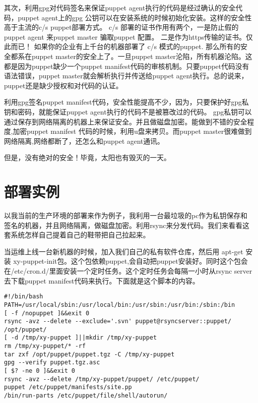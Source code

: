 \par
其次，利用gpg对代码签名来保证puppet agent执行的代码是经过确认的安全代码，puppet agent上的gpg 公钥可以在安装系统的时候初始化安装。这样的安全性高于主流的c/s puppet部署方式。 c/s 部署的证书作用有两个，一是防止假的puppet agent 来puppet master 骗取puppet 配置。 二是作为https传输的证书。仅此而已！ 如果你的企业有上千台的机器部署了 c/s 模式的puppet. 那么所有的安全都系在puppet master的安全上了。一旦puppet master沦陷，所有机器沦陷。这都是因为puppet缺少一个puppet manifest代码的审核机制。只要puppet代码没有语法错误，puppet master就会解析执行并传送给puppet agent执行。总的说来，puppet还是缺少授权和对代码的认证。\par
利用gpg签名puppet manifest代码，安全性能提高不少，因为，只要保护好gpg私钥和密码，就能保证puppet agent执行的代码不是被篡改过的代码。 gpg私钥可以通过保存到网络隔离的机器上来保证安全。并且做磁盘加密。能做到不错的安全程度,加密puppet manifest 代码的时候，利用u盘来拷贝。而puppet master很难做到网络隔离,网络都断了，还怎么和puppet agent通讯。\par
但是，没有绝对的安全！毕竟，太阳也有毁灭的一天。



\section{\msyh \small 部署实例 }
\fzsk
以我当前的生产环境的部署来作为例子，我利用一台最垃圾的pc作为私钥保存和签名的机器，并且网络隔离，做磁盘加密。利用rsync来分发代码。我们来看看这套系统怎样自己提着自己的鞋带把自己拉起来。
\par

当运维上线一台新机器的时候，加入我们自己的私有软件仓库，然后用 apt-get 安装 xy-puppet-init包。这个包依赖puppet,会自动把puppet安装好。同时这个包会在/etc/cron.d/里面安装一个定时任务。这个定时任务会每隔一小时从rsync server去下载puppet manifest代码来执行。下面就是这个脚本的内容。

\codefont\tiny \begin{lstlisting}
#!/bin/bash
PATH=/usr/local/sbin:/usr/local/bin:/usr/sbin:/usr/bin:/sbin:/bin
[ -f /nopuppet ]&&exit 0
rsync -avz --delete --exclude='.svn' puppet@rsyncserver::puppet/ /opt/puppet/
[ -d /tmp/xy-puppet ]||mkdir /tmp/xy-puppet
rm /tmp/xy-puppet/* -rf
tar zxf /opt/puppet/puppet.tgz -C /tmp/xy-puppet
gpg --verify puppet.tgz.asc
[ $? -ne 0 ]&&exit 0
rsync -avz --delete /tmp/xy-puppet/puppet/ /etc/puppet/
puppet /etc/puppet/manifests/site.pp
/bin/run-parts /etc/puppet/file/shell/autorun/
\end{lstlisting} \fzsk
\newpage


